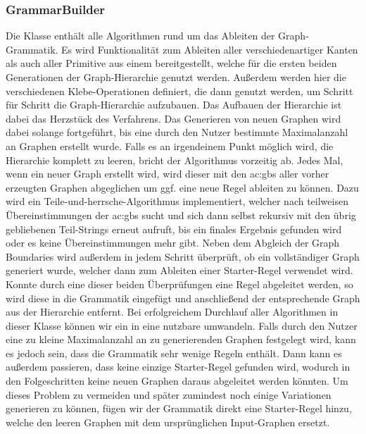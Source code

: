 \subsubsection{GrammarBuilder}
Die  Klasse enthält alle Algorithmen rund um das Ableiten der Graph-Grammatik. Es wird Funktionalität zum
Ableiten aller verschiedenartiger Kanten als auch aller Primitive aus einem  bereitgestellt, welche für die ersten beiden
Generationen der Graph-Hierarchie genutzt werden. Außerdem werden hier die verschiedenen Klebe-Operationen definiert, die dann genutzt
werden, um Schritt für Schritt die Graph-Hierarchie aufzubauen. Das Aufbauen der Hierarchie ist dabei das Herzstück des Verfahrens.
Das Generieren von neuen Graphen wird dabei solange fortgeführt, bis eine durch
den Nutzer bestimmte Maximalanzahl an Graphen erstellt wurde. Falls es an irgendeinem Punkt möglich wird, die Hierarchie komplett zu leeren,
bricht der Algorithmus vorzeitig ab. Jedes Mal, wenn ein neuer Graph erstellt wird, wird dieser mit den \gls{ac:gbs} aller vorher erzeugten
Graphen abgeglichen um ggf. eine neue Regel ableiten zu können. Dazu wird ein Teile-und-herrsche-Algorithmus implementiert, welcher
nach teilweisen Übereinstimmungen der \gls{ac:gbs} sucht und sich dann selbst rekursiv mit den übrig gebliebenen Teil-Strings erneut
aufruft, bis ein finales Ergebnis gefunden wird oder es keine Übereinstimmungen mehr gibt. Neben dem Abgleich der Graph Boundaries
wird außerdem in jedem Schritt überprüft, ob ein vollständiger Graph generiert wurde, welcher dann zum Ableiten einer Starter-Regel
verwendet wird. Konnte durch eine dieser beiden Überprüfungen eine Regel abgeleitet werden, so wird diese in die Grammatik eingefügt
und anschließend der entsprechende Graph aus der Hierarchie entfernt. Bei erfolgreichem Durchlauf aller Algorithmen in dieser Klasse
können wir ein  in eine nutzbare  umwandeln. Falls durch den Nutzer eine zu kleine Maximalanzahl
an zu generierenden Graphen festgelegt wird, kann es jedoch sein, dass die Grammatik sehr wenige Regeln enthält. Dann kann es außerdem
passieren, dass keine einzige Starter-Regel gefunden wird, wodurch in den Folgeschritten keine neuen Graphen daraus abgeleitet werden
könnten. Um dieses Problem zu vermeiden und später zumindest noch einige Variationen generieren zu können, fügen wir der Grammatik
direkt eine Starter-Regel hinzu, welche den leeren Graphen mit dem ursprünglichen Input-Graphen ersetzt.

